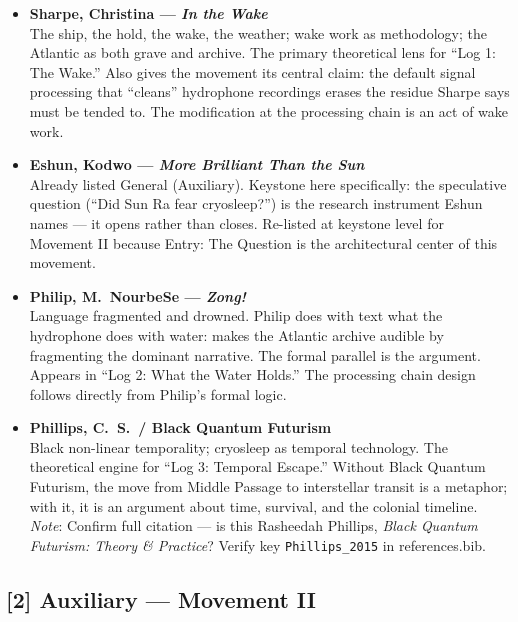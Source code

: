 \begin{itemize}

    \item \textbf{Sharpe, Christina — \textit{In the Wake}} \parencite{Sharpe_2016}\\
    The ship, the hold, the wake, the weather; wake work as methodology; the Atlantic as both grave and archive. The primary theoretical lens for ``Log 1: The Wake.'' Also gives the movement its central claim: the default signal processing that ``cleans'' hydrophone recordings erases the residue Sharpe says must be tended to. The modification at the processing chain is an act of wake work.

    \item \textbf{Eshun, Kodwo — \textit{More Brilliant Than the Sun}} \parencite{Eshun_1999}\\
    Already listed General (Auxiliary). Keystone here specifically: the speculative question (``Did Sun Ra fear cryosleep?'') is the research instrument Eshun names — it opens rather than closes. Re-listed at keystone level for Movement II because Entry: The Question is the architectural center of this movement.

    \item \textbf{Philip, M.\ NourbeSe — \textit{Zong!}} \parencite{Philip_2008}\\
    Language fragmented and drowned. Philip does with text what the hydrophone does with water: makes the Atlantic archive audible by fragmenting the dominant narrative. The formal parallel is the argument. Appears in ``Log 2: What the Water Holds.'' The processing chain design follows directly from Philip's formal logic.

    \item \textbf{Phillips, C.\ S.\ / Black Quantum Futurism} \parencite{Phillips_2015}\\
    Black non-linear temporality; cryosleep as temporal technology. The theoretical engine for ``Log 3: Temporal Escape.'' Without Black Quantum Futurism, the move from Middle Passage to interstellar transit is a metaphor; with it, it is an argument about time, survival, and the colonial timeline.\\
    \textit{Note}: Confirm full citation — is this Rasheedah Phillips, \textit{Black Quantum Futurism: Theory \& Practice}? Verify key \texttt{Phillips\_2015} in references.bib.

\end{itemize}

\subsection*{[2] Auxiliary — Movement II}


